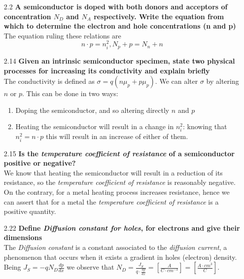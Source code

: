 \documentclass[12pt]{article}
\newcommand{\B}{\textbf}
\newcommand{\I}{\textit}
\begin{document}
\begin{itemize}
	\item[2.2] \B{A semiconductor is doped with both donors and acceptors of concentration $N_D$ and $N_A$ respectively. Write the equation from which to determine the electron and hole concentrations (n and p)}\\
	The equation ruling these relations are 
	\[
{n \cdot p = n_i^2}, {N_p + p = N_n + n}
	\]
	\item[2.14] \B{Given an intrinsic semiconductor specimen, state two physical processes for increasing its conductivity and explain briefly}\\ 
	The conductivity is defined as $\sigma = q (n\mu_p + p\mu_p)$. We can alter $\sigma$ by altering $n$ or $p$. This can be done in two ways:
	\begin{enumerate}
		\item Doping the semiconductor, and so altering directly $n$ and $p$
		\item Heating the semiconductor will result in a change in $n_i^2$: knowing that $n_i^2 = n \cdot p$ this will result in an increase of either of them.
	\end{enumerate}
	\item[2.15] \B{Is the \I{temperature coefficient of resistance} of a semiconductor positive or negative?}\\ 
	We know that heating the semiconductor will result in a reduction of its resistance, so the \I{temperature coefficient of resistance} is reasonably negative. On the contrary, for a metal heating process increases resistance, hence we can assert that for a metal the \I{temperature coefficient of resistance} is a positive quantity. 
	\item[2.22] \B{Define \I{Diffusion constant for holes}, for electrons and give their dimensions}\\
	The \I{Diffusion constant} is a constant associated to the \I{diffusion current}, a phenomenon that occurs when it exists a gradient in holes (electron) density. Being $J_S = -qN_D\frac{dp}{dx}$ we observe that $N_D = \frac{J_S}{q \cdot\frac{dp}{dx}} = [\frac{A}{C \cdot cm^{-3}}]= [\frac{A \cdot cm^3}{C}]$.
\end{itemize}
\end{document}
